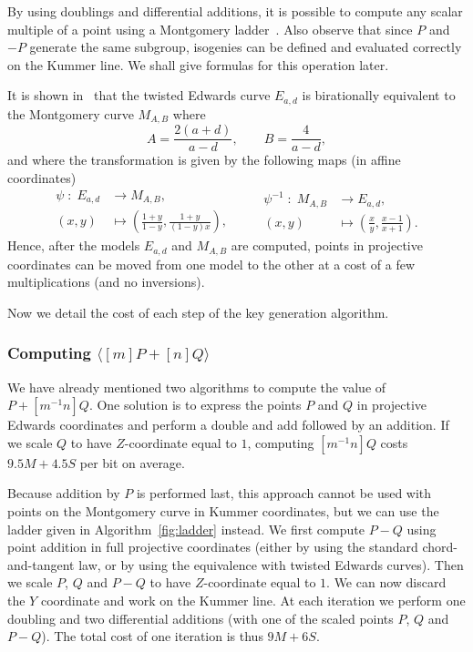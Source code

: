 \documentclass[jmc]{degruyter-journal-a}
\theoremstyle{definition}
\newcommand{\cyc}[1]{{\langle #1 \rangle}}
\begin{document}
By using doublings and differential additions, it is possible to
compute any scalar multiple of a point using a Montgomery
ladder~\cite{montgomery}. Also observe that since $P$ and $-P$
generate the same subgroup, isogenies can be defined and evaluated
correctly on the Kummer line. We shall give formulas for this
operation later.

It is shown in~\cite{twisted-edwards} that the twisted Edwards curve
$E_{a,d}$ is birationally equivalent to the Montgomery curve $M_{A,B}$
where
\begin{equation}
  A = \frac{2(a+d)}{a-d}, \qquad B = \frac{4}{a-d},
\end{equation}
and where the transformation is given by the following maps (in
affine coordinates)
\begin{equation}
  \label{eq:birational}
  \begin{aligned}
    \psi\;:\;E_{a,d}&\to M_{A,B},\\
    (x,y) &\mapsto \left(\frac{1+y}{1-y}, \frac{1+y}{(1-y)x}\right),
  \end{aligned}
  \qquad
  \begin{aligned}
    \psi^{-1}\;:\;M_{A,B}&\to E_{a,d},\\
    (x,y) &\mapsto \left(\frac{x}{y}, \frac{x-1}{x+1}\right).
  \end{aligned}
\end{equation}
Hence, after the models $E_{a,d}$ and $M_{A,B}$ are computed, points
in projective coordinates can be moved from one model to the other at
a cost of a few multiplications (and no inversions).

Now we detail the cost of each step of the key generation algorithm.

\subsubsection{Computing $\cyc{[m]P+[n]Q}$}\label{sssec:montgomery-ladder}

We have already mentioned two algorithms to compute the value of
$P+[m^{-1}n]Q$. One solution is to express the points $P$ and $Q$ in
projective Edwards coordinates and perform a double and add followed
by an addition. If we scale $Q$ to have $Z$-coordinate equal to $1$,
computing $[m^{-1}n]Q$ costs $9.5M+4.5S$ per bit on average.

Because addition by $P$ is performed last, this approach cannot
be used with points on the Montgomery curve in Kummer coordinates, but
we can use the ladder given in Algorithm~\ref{fig:ladder} instead. We
first compute $P-Q$ using point addition in full projective
coordinates (either by using the standard chord-and-tangent law, or by
using the equivalence with twisted Edwards curves). Then we scale $P$,
$Q$ and $P-Q$ to have $Z$-coordinate equal to $1$. We can now discard
the $Y$ coordinate and work on the Kummer line. At each iteration we
perform one doubling and two differential additions (with one of the
scaled points $P$, $Q$ and $P-Q$). The total cost of one iteration is
thus $9M+6S$.
\end{document}
